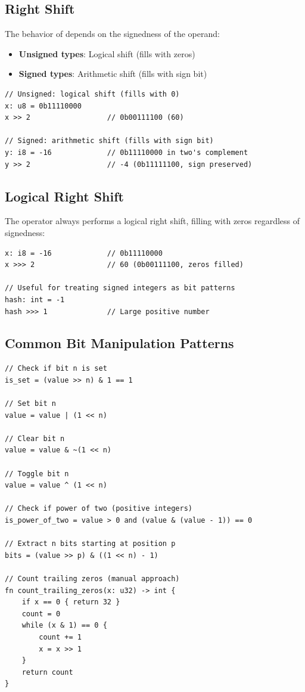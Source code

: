 \subsection{Right Shift}

The behavior of \code{>>} depends on the signedness of the operand:

\begin{itemize}
    \item \textbf{Unsigned types}: Logical shift (fills with zeros)
    \item \textbf{Signed types}: Arithmetic shift (fills with sign bit)
\end{itemize}

\begin{lstlisting}
// Unsigned: logical shift (fills with 0)
x: u8 = 0b11110000
x >> 2                  // 0b00111100 (60)

// Signed: arithmetic shift (fills with sign bit)
y: i8 = -16             // 0b11110000 in two's complement
y >> 2                  // -4 (0b11111100, sign preserved)
\end{lstlisting}

\subsection{Logical Right Shift}

The \code{>>>} operator always performs a logical right shift, filling with zeros regardless of signedness:

\begin{lstlisting}
x: i8 = -16             // 0b11110000
x >>> 2                 // 60 (0b00111100, zeros filled)

// Useful for treating signed integers as bit patterns
hash: int = -1
hash >>> 1              // Large positive number
\end{lstlisting}

\subsection{Common Bit Manipulation Patterns}

\begin{lstlisting}
// Check if bit n is set
is_set = (value >> n) & 1 == 1

// Set bit n
value = value | (1 << n)

// Clear bit n
value = value & ~(1 << n)

// Toggle bit n
value = value ^ (1 << n)

// Check if power of two (positive integers)
is_power_of_two = value > 0 and (value & (value - 1)) == 0

// Extract n bits starting at position p
bits = (value >> p) & ((1 << n) - 1)

// Count trailing zeros (manual approach)
fn count_trailing_zeros(x: u32) -> int {
    if x == 0 { return 32 }
    count = 0
    while (x & 1) == 0 {
        count += 1
        x = x >> 1
    }
    return count
}
\end{lstlisting}

